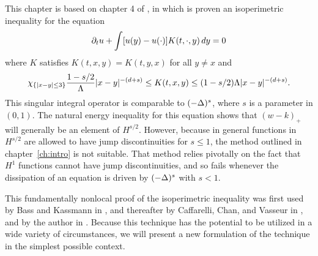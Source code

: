 %
%
%
%


%

This chapter is based on chapter 4 of \cite{CaChVa.nio}, in which is proven an isoperimetric inequality for the equation
\begin{equation} \label{eq:CCV-main}
\partial_t u + \int [u(y) - u(\cdot)] K(t,\cdot,y) \,dy = 0 
\end{equation}
where $K$ satisfies $K(t,x,y) = K(t,y,x)$ for all $y \neq x$ and 
\begin{equation} \label{CCV-coercivity for K} 
\chi_{\{|x-y| \leq 3\}} \frac{1-s/2}{\Lambda} |x-y|^{-(d+s)} \leq K(t,x,y) \leq (1-s/2)\Lambda |x-y|^{-(d+s)}. 
\end{equation}
This singular integral operator is comparable to $(-\Delta)^s$, where $s$ is a parameter in $(0,1)$.  The natural energy inequality for this equation shows that $(w-k)_+$ will generally be an element of $H^{s/2}$.  However, because in general functions in $H^{s/2}$ are allowed to have jump discontinuities for $s \leq 1$, the method outlined in chapter~\ref{ch:intro} is not suitable.  That method relies pivotally on the fact that $H^1$ functions cannot have jump discontinuities, and so fails whenever the dissipation of an equation is driven by $(-\Delta)^s$ with $s < 1$.  

This fundamentally nonlocal proof of the isoperimetric inequality was first used by Bass and Kassmann in \cite{BaKa}, and thereafter by Caffarelli, Chan, and Vasseur in \cite{CaChVa.nio}, and by the author in \cite{St.hypo}.  Because this technique has the potential to be utilized in a wide variety of circumstances, we will present a new formulation of the technique in the simplest possible context.  

